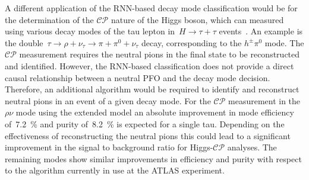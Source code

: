A different application of the RNN-based decay mode classification would be for
the determination of the $\mathcal{CP}$ nature of the Higgs boson, which can
measured using various decay modes of the tau lepton in~$H \to \tau + \tau$
events~\cite{Berge2014}. An example is the
double~$\tau \to \rho + \nu_\tau \to \pi + \pi^0 + \nu_\tau$ decay,
corresponding to the $h^\pm \pi^0$ mode. The $\mathcal{CP}$ measurement requires
the neutral pions in the final state to be reconstructed and identified.
However, the RNN-based classification does not provide a direct causal
relationship between a neutral PFO and the decay mode decision. Therefore, an
additional algorithm would be required to identify and reconstruct neutral pions
in an event of a given decay mode. For the $\mathcal{CP}$ measurement in the
$\rho\nu$ mode using the extended model an absolute improvement in mode
efficiency of~\SI{7.2}{\percent} and purity of~\SI{8.2}{\percent} is expected
for a single tau. Depending on the effectiveness of reconstructing the neutral
pions this could lead to a significant improvement in the signal to background
ratio for Higgs-$\mathcal{CP}$ analyses. The remaining modes show similar
improvements in efficiency and purity with respect to the algorithm currently in
use at the ATLAS experiment.

